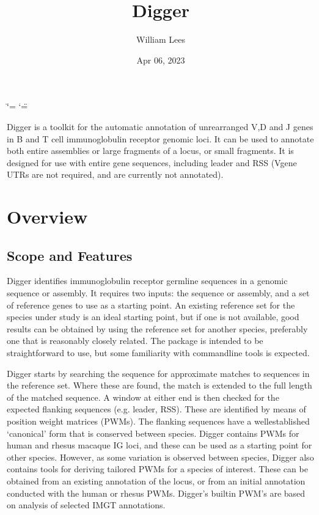 \documentclass[letterpaper,10pt,english]{sphinxmanual}
\title{Digger}
\date{Apr 06, 2023}
\author{William Lees}
\begin{document}
\ifdefined\shorthandoff
  \ifnum\catcode`\=\string=\active\shorthandoff{=}\fi
  \ifnum\catcode`\"=\active{}\fi
\fi

\pagestyle{empty}
\sphinxmaketitle
\pagestyle{plain}
\sphinxtableofcontents
\pagestyle{normal}
\label{\detokenize{index::doc}}


\sphinxAtStartPar
Digger is a toolkit for the automatic annotation of unrearranged V,D and J genes in B\sphinxhyphen{} and T\sphinxhyphen{} cell immunoglobulin receptor genomic loci. It can be used to annotate both entire assemblies or large fragments of a locus,
or small fragments. It is designed for use with entire gene sequences, including leader and RSS (V\sphinxhyphen{}gene UTRs are not required, and are currently not annotated).

\sphinxstepscope


\chapter{Overview}
\label{\detokenize{overview:overview}}\label{\detokenize{overview:overview-label}}\label{\detokenize{overview::doc}}

\section{Scope and Features}
\label{\detokenize{overview:scope-and-features}}
\sphinxAtStartPar
Digger identifies immunoglobulin receptor germline sequences in a genomic sequence or assembly. It requires two inputs: the sequence or assembly, and a set of reference genes to use as a starting point. An existing
reference set for the species under study is an ideal starting point, but if one is not available, good results can be obtained by using the reference set for another species, preferably one that is
reasonably closely related. The package is intended to be straightforward to use, but some familiarity with command\sphinxhyphen{}line tools is expected.

\sphinxAtStartPar
Digger starts by searching the sequence for approximate matches to sequences in the reference set. Where these are found, the match is extended to the full length of the matched sequence. A window
at either end is then checked for the expected flanking sequences (e.g. leader, RSS). These are identified by means of position weight matrices (PWMs). The flanking sequences have a well\sphinxhyphen{}established
‘canonical’ form that is conserved between species. Digger contains PWMs for human and rhesus macaque IG loci, and these can be used as a starting point for other species. However, as some variation
is observed between species, Digger also contains tools for deriving tailored PWMs for a species of interest. These can be obtained from an existing annotation of the locus, or from an initial
annotation conducted with the human or rhesus PWMs. Digger’s built\sphinxhyphen{}in PWM’s are based on analysis of selected IMGT annotations.
\end{document}
